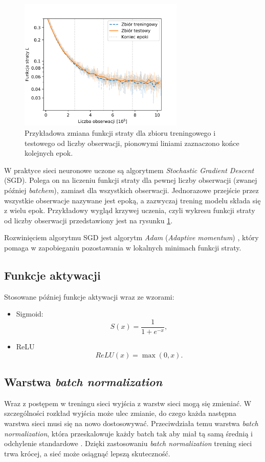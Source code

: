 \documentclass{pracalicmgr}
\begin{document}
	\begin{figure}
	\centering
	\includegraphics[width=0.7\textwidth]{loss_ensemble.png}
	\caption{Przykładowa zmiana funkcji straty dla zbioru treningowego i testowego od liczby obserwacji, pionowymi liniami zaznaczono końce kolejnych epok.}
	\label{fig:loss_example}
	\end{figure}	
	
	W praktyce sieci neuronowe uczone są algorytmem \textit{Stochastic Gradient Descent} (SGD). Polega on na liczeniu funkcji straty dla pewnej liczby obserwacji (zwanej później \textit{batchem}), zamiast dla wszystkich obserwacji. Jednorazowe przejście przez wszystkie obserwacje nazywane jest epoką, a zazwyczaj trening modelu składa się z wielu epok. Przykładowy wygląd krzywej uczenia, czyli wykresu funkcji straty od liczby obserwacji przedstawiony jest na rysunku \ref{fig:loss_example}.
	
	Rozwinięciem algorytmu SGD jest algorytm \textit{Adam} (\textit{Adaptive momentum}) \cite{adam}, który pomaga w zapobieganiu pozostawania w lokalnych minimach funkcji straty.
	
	\subsection{Funkcje aktywacji}
	Stosowane później funkcje aktywacji wraz ze wzorami:
	\begin{itemize}
	\item Sigmoid: $$S(x) = \frac{1}{1+e^{-x}},$$
	\item ReLU\cite{relu} $$ReLU(x) = \max(0, x).$$
	\end{itemize}
	
	\subsection{Warstwa \textit{batch normalization}}
	Wraz z postępem w treningu sieci wyjścia z warstw sieci mogą się zmieniać. W szczególności rozkład wyjścia może ulec zmianie, do czego każda następna warstwa sieci musi się na nowo dostosowywać. Przeciwdziała temu warstwa \textit{batch normalization}, która przeskalowuje każdy batch tak aby miał tą samą średnią i odchylenie standardowe \cite{batch_norm}. Dzięki zastosowaniu \textit{batch normalization} trening sieci trwa krócej, a sieć może osiągnąć lepszą skuteczność.
	
\end{document}
